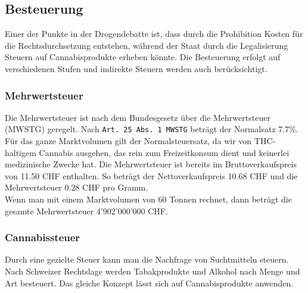 \documentclass[../main.tex]{subfiles}
\begin{document}
	 
	 \subsection{Besteuerung}
	 
	 Einer der Punkte in der Drogendebatte ist, dass durch die Prohibition Kosten für die Rechtsdurchsetzung entstehen, während der Staat durch die Legalisierung Steuern auf Cannabisprodukte erheben könnte. 
	 Die Besteuerung erfolgt auf verschiedenen Stufen und indirekte Steuern werden auch berücksichtigt.
	 
	 \subsubsection{Mehrwertsteuer}
	 Die Mehrwertsteuer ist nach dem Bundesgesetz über die Mehrwertsteuer (MWSTG) geregelt.
	 Nach \texttt{Art. 25 Abs. 1 MWSTG} beträgt der Normalsatz 7.7\%. 
	 Für das ganze Marktvolumen gilt der Normalsteuersatz, da wir von THC-haltigem Cannabis ausgehen, das rein zum Freizeitkonsum dient und keinerlei medizinische Zwecke hat. 
	 Die Mehrwertsteuer ist bereits im Bruttoverkaufspreis von 11.50 CHF enthalten. 
	 So beträgt der Nettoverkaufspreis 10.68 CHF und die Mehrwertsteuer 0.28 CHF pro Gramm. \\
	 
	 \noindent
	 Wenn man mit einem Marktvolumen von 60 Tonnen rechnet, dann beträgt die gesamte Mehrwertsteuer 4’902’000’000 CHF.
	 
	 \subsubsection{Cannabissteuer}
	 Durch eine gezielte Steuer kann man die Nachfrage von Suchtmitteln steuern. Nach Schweizer Rechtslage werden Tabakprodukte und Alkohol nach Menge und Art besteuert. 
	 Das gleiche Konzept lässt sich auf Cannabisprodukte anwenden. 
	 
	 
	 
\end{document}
